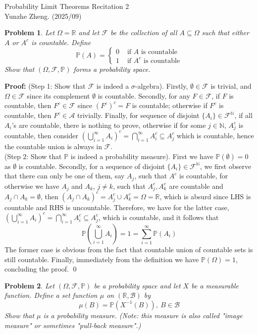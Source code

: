 \documentclass[12pt]{article}
\newtheorem{problem}{Problem}
\begin{document}
\noindent Probability Limit Theorems \hfill Recitation 2\\
Yunzhe Zheng. (2025/09)

\hrulefill

\begin{problem}
    Let $\Omega=\mathbb{R}$ and let $\mathcal{F}$ be the collection of all $A\subseteq\Omega$ such that either $A$ or $A^c$ is countable. Define 
    $$
        \mathbb{P}(A)=\begin{cases}
  0& \text{ if } A \text{ is countable}\\
  1& \text{ if } A^c \text{ is countable}
\end{cases}
    $$
    Show that $(\Omega, \mathcal{F}, \mathbb{P})$ forms a probability space.
\end{problem}

\textbf{Proof:} (Step 1: Show that $\mathcal{F}$ is indeed a $\sigma$-algebra). Firstly, $\emptyset\in\mathcal{F}$ is trivial, and $\Omega\in\mathcal{F}$ since its complement $\emptyset$ is countable. Secondly, for any $F\in\mathcal{F}$, if $F$ is countable, then $F^c\in\mathcal{F}$ since $(F^{c})^c=F$ is countable; otherwise if $F^c$ is countable, then $F^c\in\mathcal{A}$ trivially. Finally, for sequence of disjoint $\{A_i\}\in\mathcal{F}^\mathbb{N}$, if all $A_i$'s are countable, there is nothing to prove, otherwise if for some $j\in\mathbb{N}$, $A_j^c$ is countable, then consider $\left(\bigcup\limits_{i=1}^\infty A_i\right)^c=\bigcap\limits_{i=1}^\infty A_i^c\subseteq A_j^c$ which is countable, hence the countable union is always in $\mathcal{F}$. \\
\indent (Step 2: Show that $\mathbb{P}$ is indeed a probability measure). First we have $\mathbb{P}(\emptyset)=0$ as $\emptyset$ is countable. Secondly, for a sequence of disjoint $\{A_i\}\in\mathcal{F}^\mathbb{N}$, we first observe that there can only be one of them, say $A_j$, such that $A^c$ is countable, for otherwise we have $A_j$ and $A_k$, $j\neq k$, such that $A_j^c,A_k^c$ are countable and $A_j\cap A_k=\emptyset$, then $(A_j\cap A_k)^c=A_j^c\cup A_k^c=\Omega=\mathbb{R}$, which is absurd since LHS is countable and RHS is uncountable. Therefore, we have for the latter case, $\left(\bigcup\limits_{i=1}^\infty A_i\right)^c=\bigcap\limits_{i=1}^\infty A_{i}^c\subseteq A_j^c$, which is countable, and it follows that
$$
    \mathbb{P}\left(\bigcup_{i=1}^\infty A_i\right)=1=\sum\limits_{i=1}^\infty\mathbb{P}(A_i)
$$
The former case is obvious from the fact that countable union of countable sets is still countable. Finally, immediately from the definition we have $\mathbb{P}(\Omega)=1$, concluding the proof. \qed
\\
\begin{problem}
    Let $(\Omega, \mathcal{F}, \mathbb{P})$ be a probability space and let $X$ be a measurable function. Define a set function $\mu$ on $(\mathbb{R}, \mathcal{B})$ by 
    $$
        \mu(B)=\mathbb{P}(X^{-1}(B)), \ B\in\mathcal{B}
    $$
    Show that $\mu$ is a probability measure. (Note: this measure is also called "image measure" or sometimes "pull-back measure".)
\end{problem}
\end{document}
